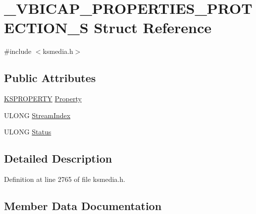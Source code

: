 \hypertarget{struct___v_b_i_c_a_p___p_r_o_p_e_r_t_i_e_s___p_r_o_t_e_c_t_i_o_n___s}{}\section{\+\_\+\+V\+B\+I\+C\+A\+P\+\_\+\+P\+R\+O\+P\+E\+R\+T\+I\+E\+S\+\_\+\+P\+R\+O\+T\+E\+C\+T\+I\+O\+N\+\_\+S Struct Reference}
\label{struct___v_b_i_c_a_p___p_r_o_p_e_r_t_i_e_s___p_r_o_t_e_c_t_i_o_n___s}


{\ttfamily \#include $<$ksmedia.\+h$>$}

\subsection*{Public Attributes}
\begin{DoxyCompactItemize}
\item 
\hyperlink{ks_8h_a4392f77c74e868d813d46c39ada4d660}{K\+S\+P\+R\+O\+P\+E\+R\+TY} \hyperlink{struct___v_b_i_c_a_p___p_r_o_p_e_r_t_i_e_s___p_r_o_t_e_c_t_i_o_n___s_a2a90db1349c8d12ffd6d061864c71dd7}{Property}
\item 
U\+L\+O\+NG \hyperlink{struct___v_b_i_c_a_p___p_r_o_p_e_r_t_i_e_s___p_r_o_t_e_c_t_i_o_n___s_a950ae647f1a34d58fbe401905146f341}{Stream\+Index}
\item 
U\+L\+O\+NG \hyperlink{struct___v_b_i_c_a_p___p_r_o_p_e_r_t_i_e_s___p_r_o_t_e_c_t_i_o_n___s_aa62fb44c607a88c89ec1d6b2681fce72}{Status}
\end{DoxyCompactItemize}


\subsection{Detailed Description}


Definition at line 2765 of file ksmedia.\+h.



\subsection{Member Data Documentation}
